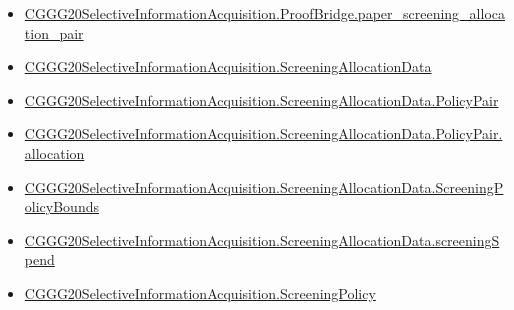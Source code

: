 \documentclass[10pt]{article}
\begin{document}
\begin{itemize}
\item \hyperlink{governing-declaration-3473de6663e953e5}{CGGG20\allowbreak{}Selective\allowbreak{}Information\allowbreak{}Acquisition.\allowbreak{}Proof\allowbreak{}Bridge.\allowbreak{}paper\_\allowbreak{}screening\_\allowbreak{}allocation\_\allowbreak{}pair}
\item \hyperlink{paper-prerequisite-f3c5f56c4a8e4ac3}{CGGG20\allowbreak{}Selective\allowbreak{}Information\allowbreak{}Acquisition.\allowbreak{}Screening\allowbreak{}Allocation\allowbreak{}Data}
\item \hyperlink{paper-prerequisite-8a6d79f3e51b72a6}{CGGG20\allowbreak{}Selective\allowbreak{}Information\allowbreak{}Acquisition.\allowbreak{}Screening\allowbreak{}Allocation\allowbreak{}Data.\allowbreak{}Policy\allowbreak{}Pair}
\item \hyperlink{governing-declaration-9408c63102b888b5}{CGGG20\allowbreak{}Selective\allowbreak{}Information\allowbreak{}Acquisition.\allowbreak{}Screening\allowbreak{}Allocation\allowbreak{}Data.\allowbreak{}Policy\allowbreak{}Pair.\allowbreak{}allocation}
\item \hyperlink{governing-declaration-ddcb7ccdba377e8d}{CGGG20\allowbreak{}Selective\allowbreak{}Information\allowbreak{}Acquisition.\allowbreak{}Screening\allowbreak{}Allocation\allowbreak{}Data.\allowbreak{}Screening\allowbreak{}Policy\allowbreak{}Bounds}
\item \hyperlink{governing-declaration-1e3e75eb414e5851}{CGGG20\allowbreak{}Selective\allowbreak{}Information\allowbreak{}Acquisition.\allowbreak{}Screening\allowbreak{}Allocation\allowbreak{}Data.\allowbreak{}screening\allowbreak{}Spend}
\item \hyperlink{paper-prerequisite-88f67c493873ffe9}{CGGG20\allowbreak{}Selective\allowbreak{}Information\allowbreak{}Acquisition.\allowbreak{}Screening\allowbreak{}Policy}
\end{itemize}
\end{document}
